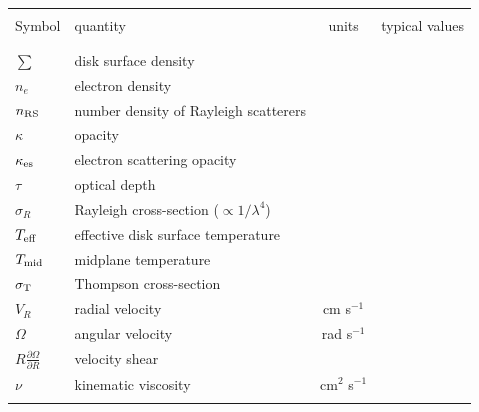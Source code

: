 \documentclass[11pt,a4paper]{article}
\begin{document}
\begin{table}
  \centering
  \begin{tabular}{ l l c r }
    \hline \hline
    &&&\\
    Symbol                                               & quantity                                                                   & units & typical values \\
    &&&\\
    \hline
    &&&\\
    $\sum$                                              & disk surface density                                                 & & \\
    $n_{e}$                                                & electron density                                                       & &\\
    $n_{\rm RS}$                                          & number density of  Rayleigh scatterers                    & &\\
    $\kappa$                                            & opacity                                                                     &  &\\
    $\kappa_{\rm es}$                                & electron scattering opacity                                       & & \\
    $\tau $                                               &  optical depth                                                           & &\\
    $\sigma_{R}$                                       & Rayleigh cross-section ($\propto 1/\lambda^{4}$)  &  &\\
    $T_{\rm eff}$                                         & effective disk surface temperature                          & &\\
    $T_{\rm mid}$                                        & midplane temperature                                              & &\\
    $\sigma_{\rm T}$                                  &  Thompson cross-section                                       & &\\
    $V_{R}$                                                 &  radial velocity                                                        & cm s$^{-1}$ &  \\
    $\Omega$                                           &  angular velocity                                                     & rad s$^{-1}$ & \\
    $R\frac{\partial \Omega}{\partial R}$  &  velocity shear                                                        &                    &   \\
    $\nu$                                                  &  kinematic viscosity                                               & cm$^{2}$ s$^{-1}$ & \\
    & & & \\
    \hline \hline
  \end{tabular}
  \caption{}
  \label{tab:physical_quantities}
\end{table}
\end{document}
